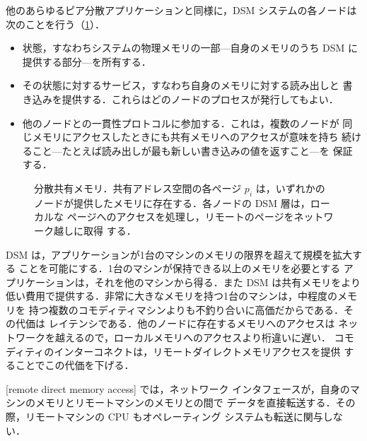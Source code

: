 \documentclass[../main.tex]{subfiles}
\begin{document}
他のあらゆるピア分散アプリケーションと同様に，DSM システムの各ノードは
次のことを行う（\cref{fig:l15-dsm}）．
\begin{itemize}
  \item 状態，すなわちシステムの物理メモリの一部---自身のメモリのうち
    DSM に提供する部分---を所有する．
  \item その状態に対するサービス，すなわち自身のメモリに対する読み出しと
    書き込みを提供する．これらはどのノードのプロセスが発行してもよい．
  \item 他のノードとの一貫性プロトコルに参加する．これは，複数のノードが
    同じメモリにアクセスしたときにも共有メモリへのアクセスが意味を持ち
    続けること---たとえば読み出しが最も新しい書き込みの値を返すこと---を
    保証する．
\end{itemize}

\begin{figure}[htbp]
  \centering
  
  \caption{分散共有メモリ．共有アドレス空間の各ページ $p_i$ は，いずれかの
    ノードが提供したメモリに存在する．各ノードの DSM 層は，ローカルな
    ページへのアクセスを処理し，リモートのページをネットワーク越しに取得
    する．}
  \label{fig:l15-dsm}
\end{figure}

DSM は，アプリケーションが1台のマシンのメモリの限界を超えて規模を拡大する
ことを可能にする．1台のマシンが保持できる以上のメモリを必要とする
アプリケーションは，それを他のマシンから得る．また DSM は共有メモリをより
低い費用で提供する．非常に大きなメモリを持つ1台のマシンは，中程度のメモリを
持つ複数のコモディティマシンよりも不釣り合いに高価だからである．その代価は
レイテンシである．他のノードに存在するメモリへのアクセスは
ネットワークを越えるので，ローカルメモリへのアクセスより桁違いに遅い．
コモディティのインターコネクトは，リモートダイレクトメモリアクセスを提供
することでこの代価を下げる．

\begin{definition}[リモートダイレクトメモリアクセス]
  [remote direct memory access]%
  では，ネットワーク
  インタフェースが，自身のマシンのメモリとリモートマシンのメモリとの間で
  データを直接転送する．その際，リモートマシンの CPU もオペレーティング
  システムも転送に関与しない．
\end{definition}
\end{document}

